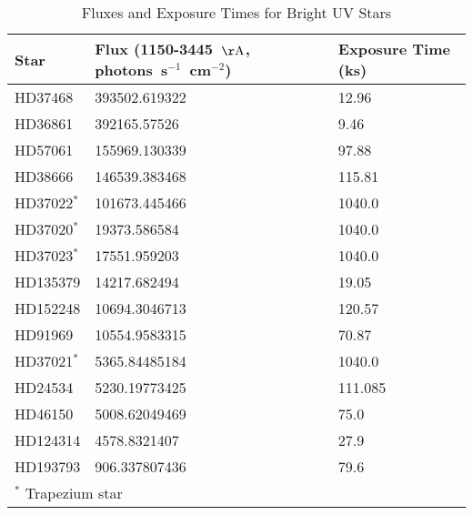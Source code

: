 \begin{table*}
\caption{Fluxes and Exposure Times for Bright UV Stars\label{tab:star_fluxes}}
\begin{center}
\begin{tabular}{lll}
\hline
\hline
Star & Flux (1150-3445~${\rm \AA}$, photons~s$^{-1}$~cm$^{-2}$) & Exposure Time (ks) \\
\hline
HD37468 & 393502.619322 & 12.96 \\
HD36861 & 392165.57526 & 9.46 \\
HD57061 & 155969.130339 & 97.88 \\
HD38666 & 146539.383468 & 115.81 \\
HD37022$^*$ & 101673.445466 & 1040.0 \\
HD37020$^*$ & 19373.586584 & 1040.0 \\
HD37023$^*$ & 17551.959203 & 1040.0 \\
HD135379 & 14217.682494 & 19.05 \\
HD152248 & 10694.3046713 & 120.57 \\
HD91969 & 10554.9583315 & 70.87 \\
HD37021$^*$ & 5365.84485184 & 1040.0 \\
HD24534 & 5230.19773425 & 111.085 \\
HD46150 & 5008.62049469 & 75.0 \\
HD124314 & 4578.8321407 & 27.9 \\
HD193793 & 906.337807436 & 79.6 \\
\hline
\multicolumn{3}{p{.6\textwidth}}{$^*$ Trapezium star}
\end{tabular}
\end{center}
\end{table*}
